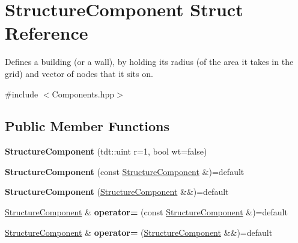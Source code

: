 \hypertarget{struct_structure_component}{}\section{Structure\+Component Struct Reference}
\label{struct_structure_component}


Defines a building (or a wall), by holding it\textquotesingle{}s radius (of the area it takes in the grid) and vector of nodes that it sits on.  




{\ttfamily \#include $<$Components.\+hpp$>$}

\subsection*{Public Member Functions}
\begin{DoxyCompactItemize}
\item 
{\bfseries Structure\+Component} (tdt\+::uint r=1, bool wt=false)\hypertarget{struct_structure_component_a4bcfdb3d4a8b2ffdc9aeac79fa18f441}{}\label{struct_structure_component_a4bcfdb3d4a8b2ffdc9aeac79fa18f441}

\item 
{\bfseries Structure\+Component} (const \hyperlink{struct_structure_component}{Structure\+Component} \&)=default\hypertarget{struct_structure_component_a6d71fc7a071b14088aaf870bc5f5e2b0}{}\label{struct_structure_component_a6d71fc7a071b14088aaf870bc5f5e2b0}

\item 
{\bfseries Structure\+Component} (\hyperlink{struct_structure_component}{Structure\+Component} \&\&)=default\hypertarget{struct_structure_component_a0fdcf5b99834b3d6464f78c23aef4a21}{}\label{struct_structure_component_a0fdcf5b99834b3d6464f78c23aef4a21}

\item 
\hyperlink{struct_structure_component}{Structure\+Component} \& {\bfseries operator=} (const \hyperlink{struct_structure_component}{Structure\+Component} \&)=default\hypertarget{struct_structure_component_ad62a4efd8d3237d0e1c565660072a515}{}\label{struct_structure_component_ad62a4efd8d3237d0e1c565660072a515}

\item 
\hyperlink{struct_structure_component}{Structure\+Component} \& {\bfseries operator=} (\hyperlink{struct_structure_component}{Structure\+Component} \&\&)=default\hypertarget{struct_structure_component_a2e4612b5c07afcdcbde0b183a1e5cc85}{}\label{struct_structure_component_a2e4612b5c07afcdcbde0b183a1e5cc85}

\end{DoxyCompactItemize}
